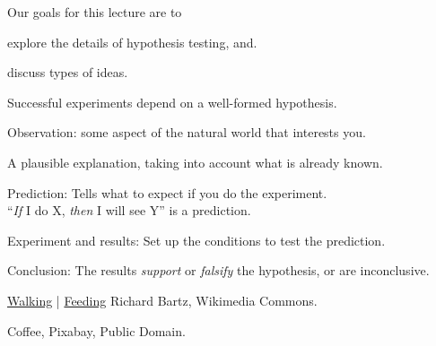 \documentclass[t]{beamer}
\begin{document}

\begin{frame}[t]{Our goals for this lecture are to}

	\hangpara explore the details of hypothesis testing, and.
	
	\hangpara discuss types of ideas.
		
\end{frame}

\begin{frame}[t]{Successful experiments depend on a well-formed hypothesis.}

	\hangpara Observation: some aspect of the natural world that interests you.

	\hangpara {} A plausible explanation, taking into account what is already known.
	
	\hangpara Prediction: Tells what to expect if you do the experiment.\\ “\textit{If} I do X, \textit{then} I will see Y” is a prediction.
	
	\hangpara Experiment and results: Set up the conditions to test the prediction.
	
	\hangpara Conclusion: The results \textit{support} or \textit{falsify} the hypothesis, or are inconclusive.

\end{frame}

{
\begin{frame}[b,plain]{}
\tiny \hspace*{60mm} \href{https://www.shutterstock.com/video/clip-3173380-stock-footage-house-fly-insect-on-food-table-walking-eating-cleaning-his-hands-leaving-dirt-and-disease.html}{Walking} | \href{https://youtu.be/N23E4jYTExk}{Feeding} \hfill Richard Bartz, Wikimedia Commons.
\end{frame}
}

{
\begin{frame}[b,plain]{}
\end{frame}
}


{
\begin{frame}[b,plain]{}
\hfill \tiny Coffee, Pixabay, Public Domain.
\end{frame}
}
\end{document}
